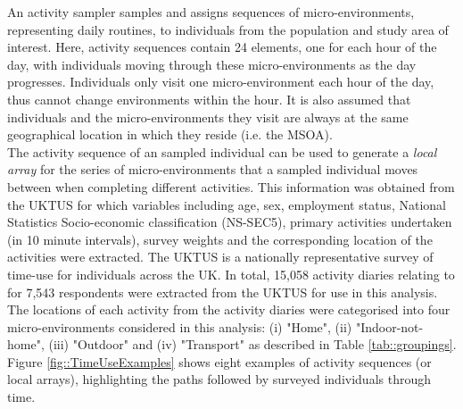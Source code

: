 \documentclass{article}
\begin{document}
An activity sampler samples and assigns sequences of micro-environments, representing daily routines, to individuals from the population and study area of interest. Here, activity sequences contain 24 elements, one for each hour of the day, with individuals moving through these micro-environments as the day progresses. Individuals only visit one micro-environment each hour of the day, thus cannot change environments within the hour. It is also assumed that individuals and the micro-environments they visit are always at the same geographical location in which they reside (i.e. the MSOA).  \\

\noindent The activity sequence of an sampled individual can be used to generate a \emph{ local array} \citep{zidek2007framework} for the series of micro-environments that a sampled individual moves between when completing different activities. This information was obtained from the UKTUS for which variables including age, sex, employment status, National Statistics Socio-economic classification (NS-SEC5), primary activities undertaken (in 10 minute intervals), survey weights and the corresponding location of the activities were extracted. The UKTUS is a nationally representative survey of time-use for individuals across the UK. In total, 15,058 activity diaries relating to for 7,543 respondents were extracted from the UKTUS for use in this analysis. The locations of each activity from the activity diaries were categorised into four micro-environments considered in this analysis: (i) "Home", (ii) "Indoor-not-home", (iii) "Outdoor" and (iv) "Transport" as described in Table \ref{tab::groupings}. Figure \ref{fig::TimeUseExamples} shows eight examples of  activity sequences (or local arrays), highlighting the paths followed by surveyed individuals through time. \\
\end{document}
